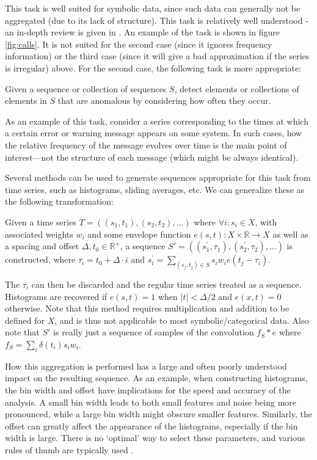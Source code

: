 This task is well suited for symbolic data, since such data can generally not be aggregated (due to its lack of structure). This task is relatively well understood - an in-depth review is given in \cite{chandola2}. An example of the task is shown in figure \ref{fig:calls}. It is not suited for the second case (since it ignores frequency information) or the third case (since it will give a bad approximation if the series is irregular) above. For the second case, the following task is more appropriate:

\begin{task}
  \label{task:frequential_anomaly_detection}
  Given a sequence or collection of sequences $S$, detect elements or collections of elements in $S$ that are anomalous by considering how often they occur.
\end{task}

As an example of this task, consider a series corresponding to the times at which a certain error or warning message appears on some system. In such cases, how the relative frequency of the message evolves over time is the main point of interest---not the structure of each message (which might be always identical).

Several methods can be used to generate sequences appropriate for this task from time series, such as histograms, sliding averages, etc. We can generalize these as the following transformation:

Given a time series $T = ((s_1, t_1), (s_2, t_2), \dots)$ where $\forall i: s_i \in X$, with associated weights $w_i$ and some envelope function $e(s, t): X \times \mathbb{R} \rightarrow X$ as well as a spacing and offset $\Delta, t_0 \in \mathbb{R}^+$, a sequence $S' = ((s_{1}^{'}, \tau_1), (s_{2}^{'}, \tau_2), \dots)$ is constructed, where $\tau_i = t_0 + \Delta \cdot i$ and $s_{i}^{'} = \sum_{(s_j, t_j) \in S} s_i w_i e(t_j - \tau_i)$.

The $\tau_i$ can then be discarded and the regular time series treated as a sequence. Histograms are recovered if $e(s, t) = 1$ when $|t| < \Delta/2$ and $e(x, t) = 0$ otherwise. Note that this method requires multiplication and addition to be defined for $X$, and is thus not applicable to most symbolic/categorical data. Also note that $S'$ is really just a sequence of samples of the convolution $f_S \ast e$ where $f_S = \sum_i \delta(t_i) s_i w_i$.

How this aggregation is performed has a large and often poorly understood impact on the resulting sequence. As an example, when constructing histograms, the bin width and offset have implications for the speed and accuracy of the analysis. A small bin width leads to both small features and noise being more pronounced, while a large bin width might obscure smaller features. Similarly, the offset can greatly affect the appearance of the histograms, especially if the bin width is large. There is no `optimal' way to select these parameters, and various rules of thumb are typically used \cite{density_estimation}.


